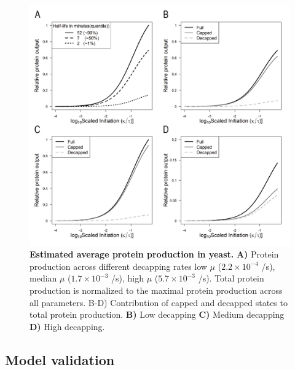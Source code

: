 \documentclass[10pt,letterpaper]{article}
\begin{document}
\begin{figure}[!h]
\begin{center}
\includegraphics[width = 120mm]{Images/2023-07-17_Protein_Production_v2.png}
\caption{{\bf Estimated average protein production in yeast.} {\bf  A)} Protein production across different decapping rates  low $\mu$ ($2.2\times 10^{-4}$ /s), median $\mu$ ($1.7\times 10^{-3}$ /s), high $\mu$ ($5.7\times 10^{-3}$ /s). Total protein production is normalized to the maximal protein production across all parameters. B-D) Contribution of capped and decapped states to total protein production. {\bf B)} Low decapping {\bf C)} Medium decapping {\bf D)} High decapping. }
\label{fig10}
\end{center}
\end{figure}


\subsection*{Model validation}
\end{document}
